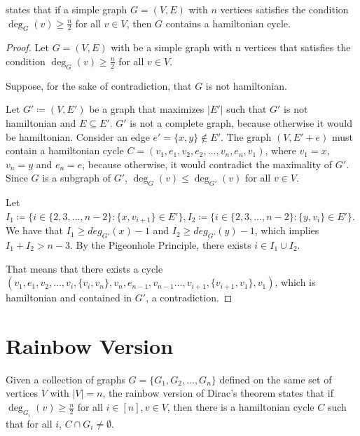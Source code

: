 \cite{dirac1952} states that if a simple graph $G = (V, E)$ with $n$ vertices satisfies the condition $\deg_G(v) \geq \frac{n}{2}$ for all $v \in V$, 
then $G$ contains a hamiltonian cycle.

\begin{proof}
    Let $G = (V, E)$ with be a simple graph with n vertices that satisfies the condition $\deg_G(v) \geq \frac{n}{2}$ for all $v \in V$.

    Suppose, for the sake of contradiction, that $G$ is not hamiltonian. 

    Let $G' \coloneqq (V, E')$ be a graph that maximizes $|E'|$ such that $G'$ is not hamiltonian and $E \subseteq E'$. 
    $G'$ is not a complete graph, because otherwise it would be hamiltonian. Consider an edge $e' = \{x, y\} \not\in E'$.
    The graph $(V, E' + e)$ must contain a hamiltonian cycle $C = (v_1, e_1, v_2, e_2, \ldots, v_n, e_{n}, v_1)$, where 
    $v_1 = x$, $v_n = y$ and $e_n = e$, because otherwise, it would contradict the maximality of $G'$.
    Since $G$ is a subgraph of $G'$, $\deg_G(v) \leq \deg_{G'}(v)$ for all $v \in V$.

    Let $I_1 \coloneqq \{i \in \{2, 3, \dots, n-2\} : \{x, v_{i+1}\} \in E'\}, 
    I_2 \coloneqq \{ i \in \{2, 3, \dots, n - 2\} : \{y, v_{i}\} \in E' \}$.
    We have that $I_1 \geq deg_{G'}(x) - 1$ and $I_2 \geq deg_{G'}(y) - 1$,
    which implies $I_1 + I_2 > n - 3$. By the Pigeonhole Principle, there exists $i \in I_1 \cup I_2$.

    That means that there exists a cycle 
    $(v_1, e_1, v_2, \dots, v_i, \{v_i, v_n\}, v_n, e_{n - 1}, v_{n-1} \dots , v_{i+1}, \{v_{i+1}, v_1\}, v_1)$, which is hamiltonian and contained in $G'$, a contradiction.

\end{proof}

\section{Rainbow Version}

Given a collection of graphs $G = \{G_1, G_2, \ldots, G_n\}$ defined on the same set of vertices $V$ with $|V| = n$,
the rainbow version of Dirac's theorem states that if $\deg_{G_i}(v) \geq \frac{n}{2}$ for all $i \in [n], v \in V$,
then there is a hamiltonian cycle $C$ such that for all $i$, $C \cap G_i \neq \emptyset$.
